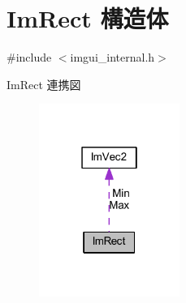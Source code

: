 \hypertarget{struct_im_rect}{}\section{Im\+Rect 構造体}
\label{struct_im_rect}


{\ttfamily \#include $<$imgui\+\_\+internal.\+h$>$}



Im\+Rect 連携図\nopagebreak
\begin{figure}[H]
\begin{center}
\leavevmode
\includegraphics[width=130pt]{struct_im_rect__coll__graph}
\end{center}
\end{figure}
